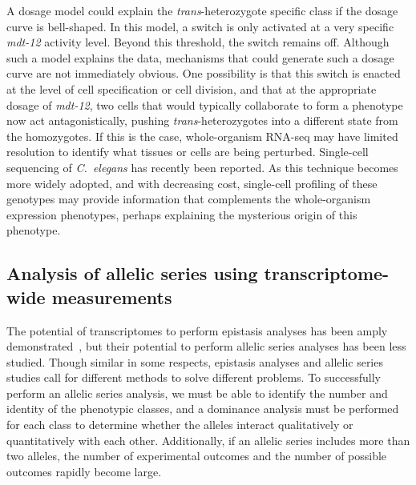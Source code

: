 \documentclass[10pt, twocolumn]{article}
\newcommand{\cel}{\emph{C.~elegans}}
\newcommand{\gene}[1]{\mbox{\emph{#1}}}
\newcommand{\dpy}{\gene{mdt-12}}
\begin{document}
A dosage model could explain the \emph{trans}-heterozygote specific class if the
dosage curve is bell-shaped. In this model, a switch is only activated at a very
specific \dpy{} activity level. Beyond this threshold, the switch remains off.
Although such a model explains the data, mechanisms that could generate such a
dosage curve are not immediately obvious. One possibility is that this switch is
enacted at the level of cell specification or cell division, and that at the
appropriate dosage of \dpy{}, two cells that would typically collaborate to form
a phenotype now act antagonistically, pushing \emph{trans}-heterozygotes into a
different state from the homozygotes. If this is the case, whole-organism
RNA-seq may have limited resolution to identify what tissues or cells are being
perturbed. Single-cell sequencing of \cel{} has recently been reported. As this
technique becomes more widely adopted, and with decreasing cost, single-cell
profiling of these genotypes may provide information that complements the
whole-organism expression phenotypes, perhaps explaining the mysterious origin
of this phenotype.

\subsection*{Analysis of allelic series using transcriptome-wide measurements}
The potential of transcriptomes to perform epistasis analyses has been amply
demonstrated~\cite{Dixit2016,Angeles-Albores2017}, but their potential to
perform allelic series analyses has been less studied. Though similar in some
respects, epistasis analyses and allelic series studies call for different
methods to solve different problems. To successfully perform an allelic series
analysis, we must be able to identify the number and identity of the phenotypic
classes, and a dominance analysis must be performed for each class to determine
whether the alleles interact qualitatively or quantitatively with each other.
Additionally, if an allelic series includes more than two alleles, the number of
experimental outcomes and the number of possible outcomes rapidly become large.
\end{document}
